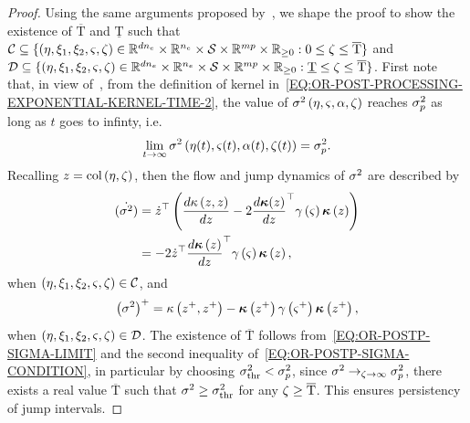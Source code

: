\begin{proof}
   Using the same arguments proposed by~\cite{hespanha2005input}, we shape the proof to show the existence of $\overline{\text{T}}$ and $\underline{\text{T}}$
   such that $\mathcal{C} \subseteq \{ \left( \eta, \xi_1, \xi_2, \varsigma, \zeta \right) \in \mathbb{R}^{dn_{e}} \times \mathbb{R}^{n_{e}} \times \mathcal{S} \times \mathbb{R}^{mp} \times \mathbb{R}_{\ge 0} : 0 \le \zeta \le \overline{\text{T}} \}$
   and $\mathcal{D} \subseteq \{ \left( \eta, \xi_1, \xi_2, \varsigma, \zeta \right) \in \mathbb{R}^{dn_{e}} \times \mathbb{R}^{n_{e}} \times \mathcal{S} \times \mathbb{R}^{mp} \times \mathbb{R}_{\ge 0} : \underline{\text{T}} \le \zeta \le \overline{\text{T}} \}$.
   First note that, in view of~, from the definition of kernel in~\eqref{EQ:OR-POST-PROCESSING-EXPONENTIAL-KERNEL-TIME-2},
   the value of $\sigma^2 \left( \eta, \varsigma, \alpha, \zeta \right)$ reaches $\sigma_p^2$ as long as $t$ goes to infinty, i.e.
   \begin{equation}%
      \label{EQ:OR-POSTP-SIGMA-LIMIT}
      \lim_{t \to \infty} \pvar \lp \im(t), \id(t), \alpha(t), \clock(t) \rp = \np.
   \end{equation}
   Recalling $z = \text{col} \left( {\eta, \zeta} \right)$, then the flow and jump dynamics of $\sigma^2$ are described by
   \begin{equation}%
      \label{EQ:OR-POSTP-SIGMA-FLOW}
      \begin{split}
         \dot{\lp \pvar\rp} & = \dot{\cvar}\T \lp \frac{d \kf \lp \cvar, \cvar \rp}{d \cvar} - 2 \frac{d \kv(\cvar)}{d \cvar}\T \gamma \lp \id \rp \kv \lp \cvar \rp \rp \\
         & = - 2 \dot{\cvar}\T \frac{d \kv \lp \cvar \rp}{d \cvar}\T \gamma \lp \id \rp \kv \lp \cvar \rp,
      \end{split}
   \end{equation}
   when $\left( \eta, \xi_1, \xi_2, \varsigma, \zeta\right) \in \mathcal{C}$, and
   \begin{equation}%
      \label{EQ:OR-POSTP-SIGMA-JUMP}
      \lp \pvar \rp^+ = \kf \lp \cvar^+, \cvar^+ \rp - \kv \lp \cvar^+ \rp \gamma \lp \id^+ \rp \kv \lp \cvar^+ \rp,
   \end{equation}
   when $\left( \eta, \xi_1, \xi_2, \varsigma, \zeta\right) \in \mathcal{D}$.
   The existence of $\overline{\text{T}}$ follows from~\eqref{EQ:OR-POSTP-SIGMA-LIMIT} and the second inequality of~\eqref{EQ:OR-POSTP-SIGMA-CONDITION},
   in particular by choosing $\sigma^2_{\text{thr}} < \sigma_p^2$, since $\sigma^2 \to_{\zeta \to \infty} \sigma_p^2$, there exists a real value $\overline{\text{T}}$
   such that $\sigma^2 \ge \sigma^2_{\text{thr}}$ for any $\zeta \ge \overline{\text{T}}$. This ensures persistency of jump intervals.

\end{proof}

